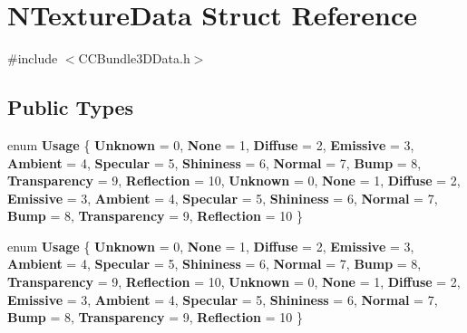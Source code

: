 \hypertarget{structNTextureData}{}\section{N\+Texture\+Data Struct Reference}
\label{structNTextureData}


{\ttfamily \#include $<$C\+C\+Bundle3\+D\+Data.\+h$>$}

\subsection*{Public Types}
\begin{DoxyCompactItemize}
\item 
\mbox{\label{structNTextureData_a4167e8ad4b5c835cf982b802927328e5}} 
enum {\bfseries Usage} \{ \newline
{\bfseries Unknown} = 0, 
{\bfseries None} = 1, 
{\bfseries Diffuse} = 2, 
{\bfseries Emissive} = 3, 
\newline
{\bfseries Ambient} = 4, 
{\bfseries Specular} = 5, 
{\bfseries Shininess} = 6, 
{\bfseries Normal} = 7, 
\newline
{\bfseries Bump} = 8, 
{\bfseries Transparency} = 9, 
{\bfseries Reflection} = 10, 
{\bfseries Unknown} = 0, 
\newline
{\bfseries None} = 1, 
{\bfseries Diffuse} = 2, 
{\bfseries Emissive} = 3, 
{\bfseries Ambient} = 4, 
\newline
{\bfseries Specular} = 5, 
{\bfseries Shininess} = 6, 
{\bfseries Normal} = 7, 
{\bfseries Bump} = 8, 
\newline
{\bfseries Transparency} = 9, 
{\bfseries Reflection} = 10
 \}
\item 
\mbox{\label{structNTextureData_a4167e8ad4b5c835cf982b802927328e5}} 
enum {\bfseries Usage} \{ \newline
{\bfseries Unknown} = 0, 
{\bfseries None} = 1, 
{\bfseries Diffuse} = 2, 
{\bfseries Emissive} = 3, 
\newline
{\bfseries Ambient} = 4, 
{\bfseries Specular} = 5, 
{\bfseries Shininess} = 6, 
{\bfseries Normal} = 7, 
\newline
{\bfseries Bump} = 8, 
{\bfseries Transparency} = 9, 
{\bfseries Reflection} = 10, 
{\bfseries Unknown} = 0, 
\newline
{\bfseries None} = 1, 
{\bfseries Diffuse} = 2, 
{\bfseries Emissive} = 3, 
{\bfseries Ambient} = 4, 
\newline
{\bfseries Specular} = 5, 
{\bfseries Shininess} = 6, 
{\bfseries Normal} = 7, 
{\bfseries Bump} = 8, 
\newline
{\bfseries Transparency} = 9, 
{\bfseries Reflection} = 10
 \}
\end{DoxyCompactItemize}
